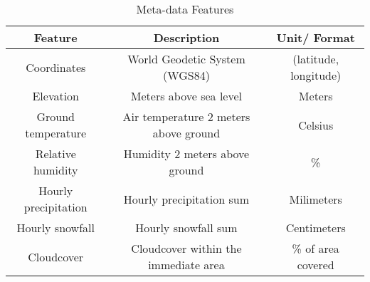 \documentclass[conference]{IEEEtran}
\begin{document}
    \begin{table}[htbp]
        \caption{Meta-data Features}
        \begin{center}
        \begin{tabular}{|c|c|c|}
        \hline
        Feature & Description & Unit/ Format \\
        \hline
        Coordinates & World Geodetic System (WGS84) & (latitude, longitude) \\
        Elevation & Meters above sea level & Meters \\
        Ground temperature & Air temperature 2 meters above ground & Celsius \\
        Relative humidity & Humidity 2 meters above ground & \% \\
        Hourly precipitation & Hourly precipitation sum & Milimeters \\
        Hourly snowfall & Hourly snowfall sum & Centimeters \\
        Cloudcover & Cloudcover within the immediate area & \% of area covered \\
        \hline
        \end{tabular}
        \label{table: open_meteo_summary}
        \end{center}
    \end{table}
\end{document}
